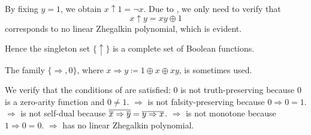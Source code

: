 \begin{example}
\begin{ExEnum}
    By fixing \( y = 1 \), we obtain \( x \uparrow 1 = \neg x \). Due to , we only need to verify that
    \begin{equation*}
      x \uparrow y = xy \oplus 1
    \end{equation*}
    corresponds to no linear Zhegalkin polynomial, which is evident.

    Hence the singleton set \( \{ \uparrow \} \) is a complete set of Boolean functions.

     The family \( \{ \Rightarrow, 0 \} \), where \( x \Rightarrow y \coloneqq 1 \oplus x \oplus xy \), is sometimes used.

    We verify that the conditions of  are satisfied:
      \( 0 \) is not truth-preserving because \( 0 \) is a zero-arity function and \( 0 \neq 1 \).
     \( \Rightarrow \) is not falsity-preserving because \( 0 \Rightarrow 0 = 1 \).
     \( \Rightarrow \) is not self-dual because \( \overline{\overline{x} \Rightarrow \overline{y}} = \overline{y \Rightarrow x} \).
     \( \Rightarrow \) is not monotone because \( 1 \Rightarrow 0 = 0 \).
     \( \Rightarrow \) has no linear Zhegalkin polynomial.
  \end{ExEnum}
\end{example}
